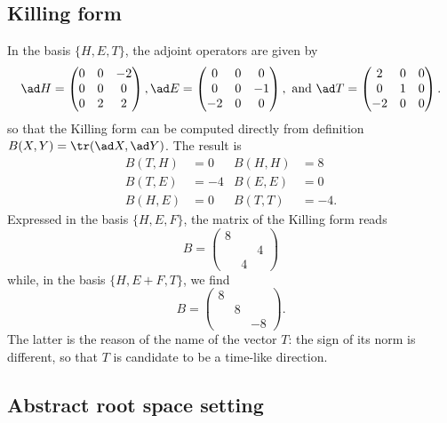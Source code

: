 \subsection{Killing form}

In the basis $\{ H,E,T \}$, the adjoint operators are given by
\[
\ad H=\begin{pmatrix}
 0 & 0 &-2 \\
 0 & 0 &0 \\
 0 & 2 &2
\end{pmatrix},
\ad E=\begin{pmatrix}
 0 & 0 &0 \\
 0 & 0 &-1\\
-2 & 0&0
\end{pmatrix},\textrm{ and }
  \ad T=\begin{pmatrix}
 2 & 0 &0 \\
0 & 1 &0\\
-2 & 0&0
\end{pmatrix}.
\]
so that the Killing form can be computed directly from definition $B(X,Y)=\tr(\ad X,\ad Y)$. The result is
\begin{subequations}
\begin{align}
B(T,H)&=0  & B(H,H)&=8\\
B(T,E)&=-4 & B(E,E)&=0\\
B(H,E)&=0  &  B(T,T)&=-4.
\end{align}
\end{subequations}
Expressed in the basis $\{H,E,F\}$, the matrix of the Killing form reads
\begin{equation}
B=
\begin{pmatrix}
8&&\\
&&4\\
&4&
\end{pmatrix}
\end{equation}
while, in the basis  $\{H,E+F,T\}$, we find
\begin{equation}   \label{EqBHEFTsldR}
B=
\begin{pmatrix}
8\\
&8\\
&&-8
\end{pmatrix}.
\end{equation}
The latter is the reason of the name of the vector $T$: the sign of its norm is different, so that $T$ is candidate to be a time-like direction.

\subsection{Abstract root space setting}

